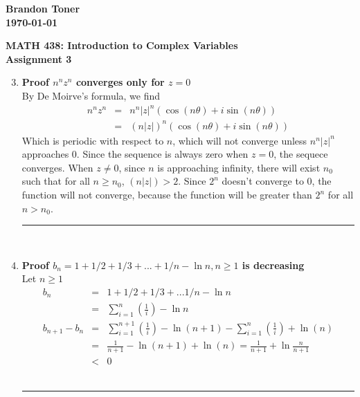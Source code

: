 \documentclass{article}%
\newcommand\abs[1]{\left|#1\right|}
\newenvironment{proof}[1][]{\begin{samepage}\textbf{Proof #1} \\ }{\\ \rule{0.5em}{0.5em} \end{samepage} \\}
\begin{document}
\begin{flushright}
\textbf{Brandon Toner \\
\today}
\end{flushright}

\begin{center}
\textbf{MATH 438: Introduction to Complex Variables \\
Assignment 3} \\
\end{center}

\begin{enumerate}
    \setcounter{enumi}{2}
    \item %
    \begin{proof}[$n^n z^n$ converges only for $z=0$]
        By De Moirve's formula, we find
        \begin{eqnarray*}
            n^n z^n &=& n^n \abs{z}^n (\cos(n\theta) + i \sin(n\theta)) \\
                    &=& (n \abs{z})^n (\cos(n\theta) + i \sin(n\theta))
        \end{eqnarray*}
        Which is periodic with respect to $n$, which will not converge unless $n^n \abs{z}^n$ approaches $0$. 
        Since the sequence is always zero when $z = 0$, the sequece converges.  When $z \neq 0$, since $n$ is approaching infinity,
        there will exist $n_0$ such that for all $n \geq n_0$, $(n \abs{z}) > 2$. Since $2^n$ doesn't converge to $0$, the function
        will not converge, because the function will be greater than $2^n$ for all $n>n_0$.
    \end{proof}
    \setcounter{enumi}{4}
    \item %
    \begin{proof}[$b_n = 1 + 1/2 + 1/3 + ... + 1/n - \ln{n}, n \geq 1$ is decreasing]
        Let $n \geq 1$
        \begin{eqnarray*}
            b_n &=& 1 + 1/2 + 1/3 + ... 1/n - \ln{n} \\
                &=& \sum\limits_{i=1}^{n}\left(\frac{1}{i}\right)-\ln{n} \\
            b_{n+1}-b_{n} &=& \sum\limits_{i=1}^{n+1}\left(\frac{1}{i}\right)-\ln(n+1) - \sum\limits_{i=1}^{n}\left(\frac{1}{i}\right)+\ln(n) \\
                          &=& \frac{1}{n+1} - \ln(n+1) + \ln(n) = \frac{1}{n+1} + \ln{\frac{n}{n+1}} \\
                          &<& 0
        \end{eqnarray*}
    \end{proof}

\end{enumerate}
\end{document}
